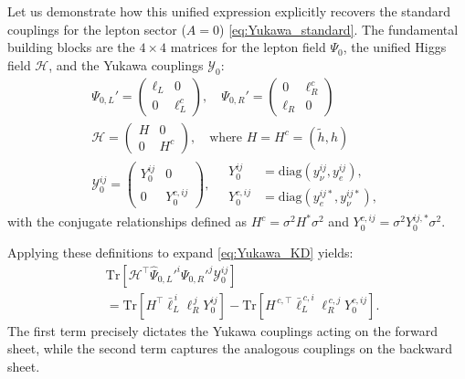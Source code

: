 Let us demonstrate how this unified expression explicitly recovers the standard couplings for the lepton sector ($A=0$) \cref{eq:Yukawa_standard}. The fundamental building blocks are the $4 \times 4$ matrices for the lepton field $\Psi_0$, the unified Higgs field $\mathcal{H}$, and the Yukawa couplings $\mathcal{Y}_0$:
\begin{gather}
    \Psi_{0,L}'=\begin{pmatrix} \ell_L & 0 \\ 0 & \ell_L^c \end{pmatrix}, \quad
    \Psi_{0,R}'=\begin{pmatrix} 0 & \ell_R^c \\ \ell_R & 0 \end{pmatrix}\\
    \mathcal{H} = \begin{pmatrix} H & 0 \\ 0 & H^{c} \end{pmatrix}, \quad \text{where } H=H^c=(\tilde h, h) \\
    \!\!\mathcal{Y}_0^{ij} = \begin{pmatrix}
        Y_0^{ij} & 0 \\ 0 & Y_0^{c,ij}
    \end{pmatrix}, \quad
    \begin{aligned}
        Y_0^{ij} &= \text{diag}(y_\nu^{ij}, y_e^{ij}), \\
        Y_0^{c,ij} &= \text{diag}(y_e^{ij*}, y_\nu^{ij*}),
    \end{aligned}
\end{gather}
with the conjugate relationships defined as $H^c=\sigma^2H^*\sigma^2$ and $Y_0^{c,ij}=\sigma^2Y_0^{ij,*}\sigma^2$.

Applying these definitions to expand \cref{eq:Yukawa_KD} yields:
\vspace{-0.1cm}
\begin{equation}\label{eq:yukawa_expand}
\begin{aligned}
    &\text{Tr}[\mathcal{H}^{\top}\widehat{\Psi}_{0,L}'^{i}\Psi_{0,R}'^j \mathcal{Y}_0^{ij}] \nonumber \\
    &=\text{Tr}[H^{\top}\bar{\ell}_{L}^{\,i}\ell_{R}^{\,j} Y_0^{ij}] - \text{Tr}[H^{\,c,\top}\bar{\ell}_{L}^{\,c,i}\ell_{R}^{\,c,j} Y_0^{c,ij}].
\end{aligned}
\end{equation}
The first term precisely dictates the Yukawa couplings acting on the forward sheet, while the second term captures the analogous couplings on the backward sheet.

